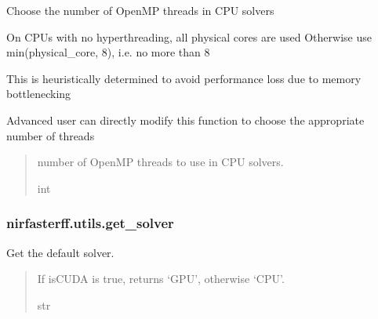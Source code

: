 \documentclass[letterpaper,10pt,english]{sphinxmanual}
\begin{document}
\begin{fulllineitems}
\label{\detokenize{_autosummary/nirfasterff.utils.get_nthread:nirfasterff.utils.get_nthread}}
\pysigstartsignatures
\pysiglinewithargsret
{}
{}
{}
\pysigstopsignatures
\sphinxAtStartPar
Choose the number of OpenMP threads in CPU solvers

\sphinxAtStartPar
On CPUs with no hyperthreading, all physical cores are used
Otherwise use min(physical\_core, 8), i.e. no more than 8

\sphinxAtStartPar
This is heuristically determined to avoid performance loss due to memory bottlenecking

\sphinxAtStartPar
Advanced user can directly modify this function to choose the appropriate number of threads
\begin{quote}\begin{description}
\sphinxAtStartPar
{} \textendash{} number of OpenMP threads to use in CPU solvers.

\sphinxAtStartPar
int

\end{description}\end{quote}

\end{fulllineitems}


\sphinxstepscope


\subsubsection{nirfasterff.utils.get\_solver}
\label{\detokenize{_autosummary/nirfasterff.utils.get_solver:nirfasterff-utils-get-solver}}\label{\detokenize{_autosummary/nirfasterff.utils.get_solver::doc}}

\begin{fulllineitems}
\label{\detokenize{_autosummary/nirfasterff.utils.get_solver:nirfasterff.utils.get_solver}}
\pysigstartsignatures
\pysiglinewithargsret
{}
{}
{}
\pysigstopsignatures
\sphinxAtStartPar
Get the default solver.
\begin{quote}\begin{description}
\sphinxAtStartPar
If isCUDA is true, returns ‘GPU’, otherwise ‘CPU’.

\sphinxAtStartPar
str

\end{description}\end{quote}

\end{fulllineitems}
\end{document}
